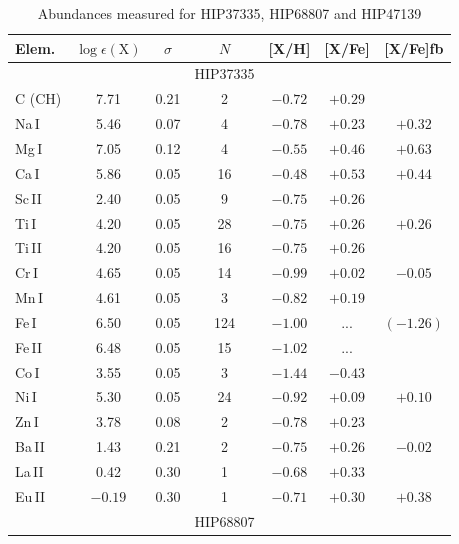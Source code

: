 \documentclass[manuscript]{aastex}
\begin{document}
\begin{table}
  \begin{center}
 \caption{Abundances measured for HIP37335, HIP68807 and HIP47139}
 \label{tab:hipabund}
    {\tiny
    \begin{tabular}{l c c c c c c }
     \hline \hline
Elem.  & $\log\epsilon (\mbox{X})$ & $\sigma$ & $N$ & [X/H] & [X/Fe] & [X/Fe]fb \\ \hline
       &          &       & HIP37335 &              &             &            \\ \hline
C (CH) &   7.71   & 0.21    &  2    &    $ -0.72 $  &  $ +0.29 $  &             \\
Na\,I  &   5.46   & 0.07    &  4    &    $ -0.78 $  &  $ +0.23 $  &   $+0.32 $  \\       
Mg\,I  &   7.05   & 0.12    &  4    &    $ -0.55 $  &  $ +0.46 $  &   $+0.63 $  \\       
Ca\,I  &   5.86   & 0.05    &  16   &    $ -0.48 $  &  $ +0.53 $  &   $+0.44 $  \\       
Sc\,II &   2.40   & 0.05    &  9    &    $ -0.75 $  &  $ +0.26 $  &   $      $  \\       
Ti\,I  &   4.20   & 0.05    &  28   &    $ -0.75 $  &  $ +0.26 $  &   $+0.26 $  \\       
Ti\,II &   4.20   & 0.05    &  16   &    $ -0.75 $  &  $ +0.26 $  &   $      $  \\       
Cr\,I  &   4.65   & 0.05    &  14   &    $ -0.99 $  &  $ +0.02 $  &   $-0.05 $  \\       
Mn\,I  &   4.61   & 0.05    &  3    &    $ -0.82 $  &  $ +0.19 $  &   $      $  \\       
Fe\,I  &   6.50   & 0.05    &  124  &    $ -1.00 $  &  $ ...   $  &  $(-1.26)$  \\       
Fe\,II &   6.48   & 0.05    &  15   &    $ -1.02 $  &  $ ...   $  &   $      $  \\  
Co\,I  &   3.55   & 0.05    &  3    &    $ -1.44 $  &  $ -0.43 $  &             \\
Ni\,I  &   5.30   & 0.05    &  24   &    $ -0.92 $  &  $ +0.09 $  &   $+0.10 $  \\   
Zn\,I  &   3.78   & 0.08    &   2   &    $ -0.78 $  &  $ +0.23 $  &   $      $  \\       
Ba\,II &   1.43   & 0.21    &  2    &    $ -0.75 $  &  $ +0.26 $  &   $-0.02 $  \\
La\,II &   0.42   & 0.30    &  1    &    $ -0.68 $  &  $ +0.33 $  &             \\
Eu\,II & $-0.19$  & 0.30    &  1    &    $ -0.71 $  &  $ +0.30	$  &   $+0.38 $  \\  \hline      
       &          &       & HIP68807 &              &             &            \\ \hline


\end{tabular}}
\end{center}
\end{table}
\end{document}
